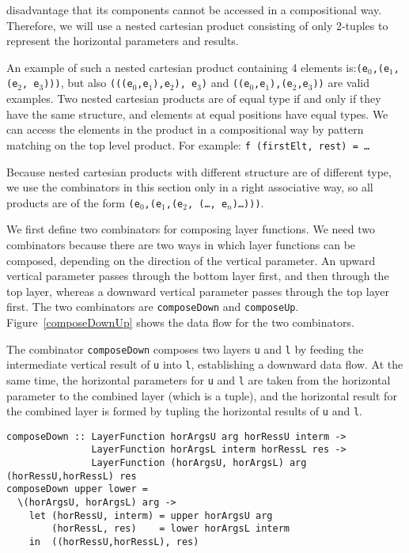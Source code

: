       disadvantage that its components cannot be accessed in a compositional way.
      Therefore, we will use a nested cartesian product consisting of only 2-tuples
      to represent the horizontal parameters and results.
\par An example of such a nested cartesian product containing 4 elements
      is:\texttt{(e$_0$,(e$_1$,(e$_2$, e$_3$)))}, but also
      \texttt{(((e$_0$,e$_1$),e$_2$), e$_3$)} and
      \texttt{((e$_0$,e$_1$),(e$_2$,e$_3$))} are valid examples. Two nested cartesian
      products are of equal type if and only if they have the same structure, and
      elements at equal positions have equal types. We can access the elements in the
      product in a compositional way by pattern matching on the top level product.
      For example: \texttt{f (firstElt, rest) = \dots}
\par  Because nested cartesian products with different structure are of
      different type, we use the combinators in this section only in a right
      associative way, so all products are of the form \texttt{(e$_0$,(e$_1$,(e$_2$,
      (\dots, e$_n$)\dots)))}. 
\par We first define two combinators for composing layer functions. We need
      two combinators because there are two ways in which layer functions can be
      composed, depending on the direction of the vertical parameter. An upward
      vertical parameter passes through the bottom layer first, and then through the
      top layer, whereas a downward vertical parameter passes through the top layer
      first. The two combinators are \texttt{composeDown} and \texttt{composeUp}.
      Figure~\ref{composeDownUp} shows the data flow for the two
      combinators. 
\par The combinator \texttt{composeDown} composes two layers \texttt{u} and
      \texttt{l} by feeding the intermediate vertical result of \texttt{u} into
      \texttt{l}, establishing a downward data flow. At the same time, the horizontal
      parameters for \texttt{u} and \texttt{l} are taken from the horizontal
      parameter to the combined layer (which is a tuple), and the horizontal result
      for the combined layer is formed by tupling the horizontal results of
      \texttt{u} and \texttt{l}.\begin{small}\begin{verbatim}composeDown :: LayerFunction horArgsU arg horRessU interm ->
               LayerFunction horArgsL interm horRessL res ->
               LayerFunction (horArgsU, horArgsL) arg (horRessU,horRessL) res
composeDown upper lower = 
  \(horArgsU, horArgsL) arg ->                                           
    let (horRessU, interm) = upper horArgsU arg
        (horRessL, res)    = lower horArgsL interm            
    in  ((horRessU,horRessL), res)\end{verbatim}\end{small}

